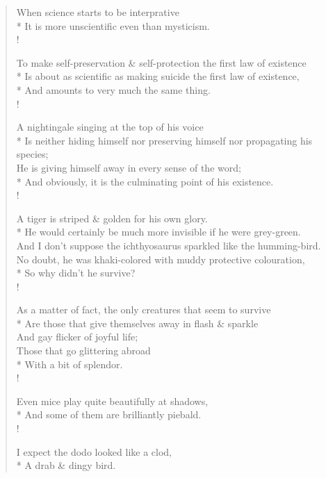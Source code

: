 \documentclass[MAIN]{subfiles}
\begin{document}
\begin{verse}
When science starts to be interprative\\*
It is more unscientific even than mysticism.\\!

To make self-preservation \& self-protection the first law of existence\\*
Is about as scientific as making suicide the first law of existence,\\*
And amounts to very much the same thing.\\!

A nightingale singing at the top of his voice\\*
Is neither hiding himself nor preserving himself nor propagating his species;\\
He is giving himself away in every sense of the word;\\*
And obviously, it is the culminating point of his existence.\\!

A tiger is striped \& golden for his own glory.\\*
He would certainly be much more invisible if he were grey-green.\\
And I don't suppose the ichthyosaurus sparkled like the humming-bird.\\
No doubt, he was khaki-colored with muddy protective colouration,\\*
So why didn't he survive?\\!

As a matter of fact, the only creatures that seem to survive\\*
Are those that give themselves away in flash \& sparkle\\
And gay flicker of joyful life;\\
Those that go glittering abroad\\*
With a bit of splendor.\\!

Even mice play quite beautifully at shadows,\\*
And some of them are brilliantly piebald.\\!

I expect the dodo looked like a clod,\\*
A drab \& dingy bird.
\end{verse}
               
\end{document}
